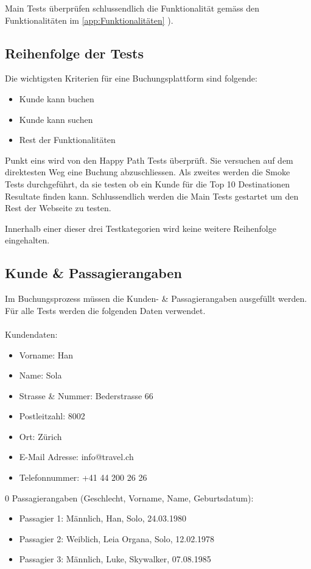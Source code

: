 Main Tests überprüfen schlussendlich die Funktionalität gemäss den Funktionalitäten im \cref{app:Funktionalitäten} ).

\subsection{Reihenfolge der Tests}
Die wichtigsten Kriterien für eine Buchungsplattform sind folgende:
\begin{itemize}
\item Kunde kann buchen
\item Kunde kann suchen
\item Rest der Funktionalitäten
\end{itemize}
Punkt eins wird von den Happy Path Tests überprüft. Sie versuchen auf dem direktesten Weg eine Buchung abzuschliessen. Als zweites werden die Smoke Tests durchgeführt, da sie testen ob ein Kunde für die Top 10 Destinationen Resultate finden kann. Schlussendlich werden die Main Tests gestartet um den Rest der Webseite zu testen.

Innerhalb einer dieser drei Testkategorien wird keine weitere Reihenfolge eingehalten.

\subsection{Kunde \& Passagierangaben}
\label{sec:Konzept:Übersicht:Angaben}
Im Buchungsprozess müssen die Kunden- \& Passagierangaben ausgefüllt werden. Für alle Tests werden die folgenden Daten verwendet.\\
\\  
Kundendaten:
\begin{itemize}
\item Vorname: Han
\item Name: Sola
\item Strasse \& Nummer: Bederstrasse 66
\item Postleitzahl: 8002
\item Ort: Zürich
\item E-Mail Adresse: info@travel.ch
\item Telefonnummer: +41 44 200 26 26 
\end{itemize}

\begin{addmargin*}[0cm]{0\marginwidth}
Passagierangaben (Geschlecht, Vorname, Name, Geburtsdatum):
	\begin{itemize}
	\item Passagier 1: Männlich, Han, Solo, 24.03.1980
	\item Passagier 2: Weiblich, Leia Organa, Solo, 12.02.1978
	\item Passagier 3: Männlich, Luke, Skywalker, 07.08.1985
	\end{itemize}
\end{addmargin*}


